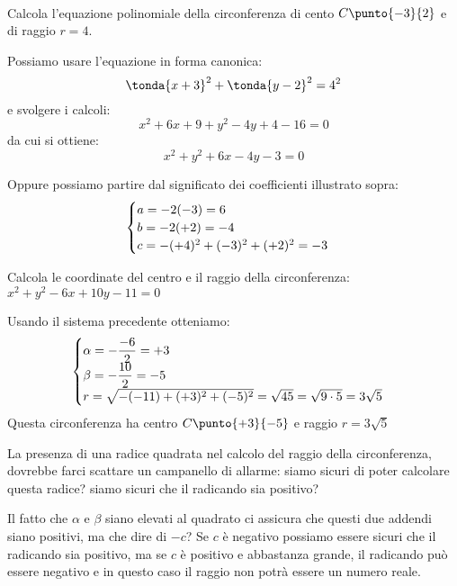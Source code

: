 \begin{esempio}
~

\noindent\begin{minipage}{.55\textwidth}
Calcola l'equazione polinomiale della circonferenza di cento \(C\punto{-3}{2}\) 
e di raggio \(r=4\).

Possiamo usare l'equazione in forma canonica:
\[\tonda{x+3}^2 + \tonda{y-2}^2 = 4^2\]
e svolgere i calcoli:
\[x^2 +6x+9 +y^2 -4y +4 -16 = 0\]
da cui si ottiene:
\[x^2 +y^2 +6x -4y -3 = 0\]
\end{minipage}
\hfill
\begin{minipage}{.43\textwidth}
\begin{center}
\begin{inaccessibleblock}
  \circtraslata
\end{inaccessibleblock}
\end{center}
\end{minipage}
Oppure possiamo partire dal significato dei coefficienti illustrato sopra:
\[\begin{cases}a = -2(-3)=6 \\ b = -2(+2)=-4 \\ c = -(+4)^2 +(-3)^2 +(+2)^2=-3\end{cases}\]
\end{esempio}

\begin{esempio}
Calcola le coordinate del centro e il raggio della circonferenza:
\(x^2 +y^2 -6x + 10y -11 = 0\)

Usando il sistema precedente otteniamo:
\[\begin{cases}\alpha = -\dfrac{-6}{2} = +3\\ 
           \beta = -\dfrac{10}{2} = -5 \\ 
           r = \sqrt{-(-11) +(+3)^2 + (-5)^2} = \sqrt{45}= 
               \sqrt{9 \cdot 5} = 3\sqrt{5}\end{cases}\]
Questa circonferenza ha centro \(C\punto{+3}{-5}\) e raggio \(r=3\sqrt{5}\)
\end{esempio}

\begin{osservazione}
La presenza di una radice quadrata nel calcolo del raggio della circonferenza, 
dovrebbe farci scattare un campanello di allarme: siamo sicuri di poter 
calcolare questa radice? siamo sicuri che il radicando sia positivo?

Il fatto che \(\alpha\) e \(\beta\) siano elevati al quadrato ci assicura che 
questi due addendi siano positivi, ma che dire di \(-c\)? Se \(c\) è negativo 
possiamo essere sicuri che il radicando sia positivo, ma se \(c\) è positivo e 
abbastanza grande, il radicando può essere negativo e in questo caso il raggio 
non potrà essere un numero reale.
\end{osservazione}

